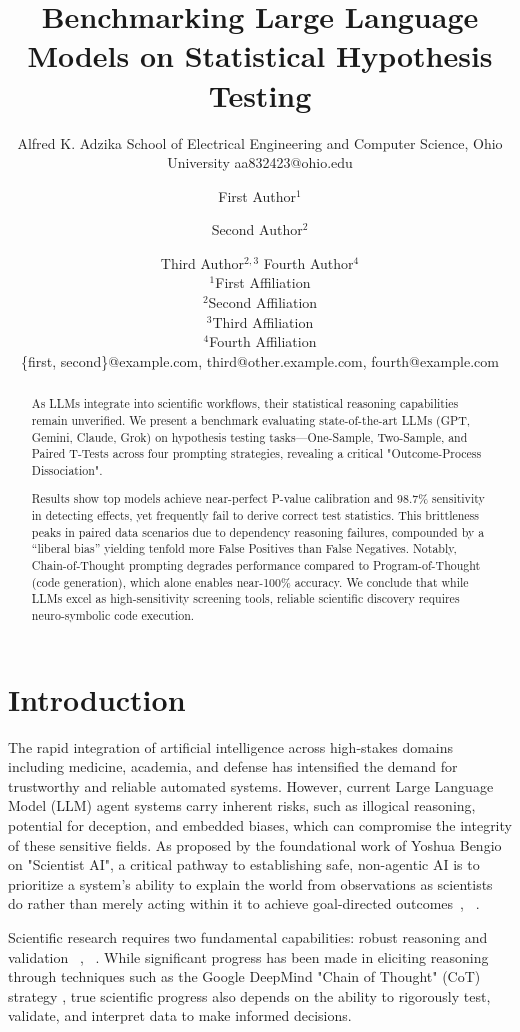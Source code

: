 \documentclass{article}
\title{Benchmarking Large Language Models on Statistical Hypothesis Testing}
\author{
    Alfred K. Adzika
    \affiliations
    School of Electrical Engineering and Computer Science, Ohio University
    \emails
    aa832423@ohio.edu
}
\author{
First Author$^1$
\and
Second Author$^2$\and
Third Author$^{2,3}$\And
Fourth Author$^4$\\
\affiliations
$^1$First Affiliation\\
$^2$Second Affiliation\\
$^3$Third Affiliation\\
$^4$Fourth Affiliation\\
\emails
\{first, second\}@example.com,
third@other.example.com,
fourth@example.com
}
\begin{document}
\maketitle

\begin{abstract}
As LLMs integrate into scientific workflows, their statistical reasoning capabilities remain unverified. We present a benchmark evaluating state-of-the-art LLMs (GPT, Gemini, Claude, Grok) on hypothesis testing tasks—One-Sample, Two-Sample, and Paired T-Tests across four prompting strategies, revealing a critical "Outcome-Process Dissociation".

Results show top models achieve near-perfect P-value calibration and 98.7\% sensitivity in detecting effects, yet frequently fail to derive correct test statistics. This brittleness peaks in paired data scenarios due to dependency reasoning failures, compounded by a ``liberal bias'' yielding tenfold more False Positives than False Negatives. Notably, Chain-of-Thought prompting degrades performance compared to Program-of-Thought (code generation), which alone enables near-100\% accuracy. We conclude that while LLMs excel as high-sensitivity screening tools, reliable scientific discovery requires neuro-symbolic code execution.
\end{abstract}


\section{Introduction}
The rapid integration of artificial intelligence across high-stakes domains including medicine, academia, and defense has intensified the demand for trustworthy and reliable automated systems. However, current Large Language Model (LLM) agent systems carry inherent risks, such as illogical reasoning, potential for deception, and embedded biases, which can compromise the integrity of these sensitive fields\cite{bengio2025superintelligent}. As proposed by the foundational work of Yoshua Bengio on "Scientist AI", a critical pathway to establishing safe, non-agentic AI is to prioritize a system's ability to explain the world from observations as scientists do rather than merely acting within it to achieve goal-directed outcomes~\cite{bengio2025superintelligent}, ~\cite{yamada2025ai}.

Scientific research requires two fundamental capabilities: robust reasoning and validation ~\cite{koslowski1996theory}, ~\cite{national2012assessing}. While significant progress has been made in eliciting reasoning through techniques such as the Google DeepMind "Chain of Thought" (CoT) strategy \cite{wei2022chain}, true scientific progress also depends on the ability to rigorously test, validate, and interpret data to make informed decisions. 
\end{document}
